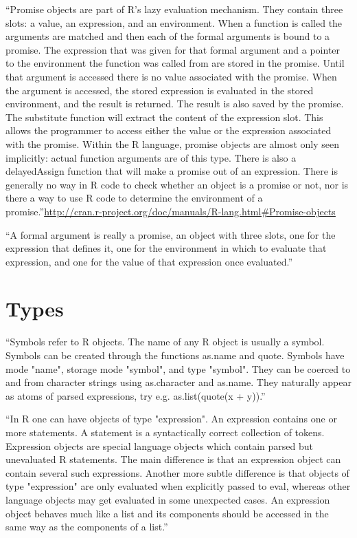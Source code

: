 ``Promise objects are part of R’s lazy evaluation mechanism. They contain three slots: a value, an expression, and an environment. When a function is called the arguments are matched and then each of the formal arguments is bound to a promise. The expression that was given for that formal argument and a pointer to the environment the function was called from are stored in the promise.
Until that argument is accessed there is no value associated with the promise. When the argument is accessed, the stored expression is evaluated in the stored environment, and the result is returned. The result is also saved by the promise. The substitute function will extract the content of the expression slot. This allows the programmer to access either the value or the expression associated with the promise.
Within the R language, promise objects are almost only seen implicitly: actual function arguments are of this type. There is also a delayedAssign function that will make a promise out of an expression. There is generally no way in R code to check whether an object is a promise or not, nor is there a way to use R code to determine the environment of a promise.''\url{http://cran.r-project.org/doc/manuals/R-lang.html#Promise-objects}

``A formal argument is really a promise, an object with three slots, one for the expression that defines it, one for the environment in which to evaluate that expression, and one for the value of that expression once evaluated.''

\section{Types}
\label{sect:}


``Symbols refer to R objects. The name of any R object is usually a symbol. Symbols can be created through the functions as.name and quote.
Symbols have mode "name", storage mode "symbol", and type "symbol". They can be coerced to and from character strings using as.character and as.name. They naturally appear as atoms of parsed expressions, try e.g. as.list(quote(x + y)).''

``In R one can have objects of type "expression". An expression contains one or more statements. A statement is a syntactically correct collection of tokens. Expression objects are special language objects which contain parsed but unevaluated R statements. The main difference is that an expression object can contain several such expressions. Another more subtle difference is that objects of type "expression" are only evaluated when explicitly passed to eval, whereas other language objects may get evaluated in some unexpected cases.
An expression object behaves much like a list and its components should be accessed in the same way as the components of a list.''

